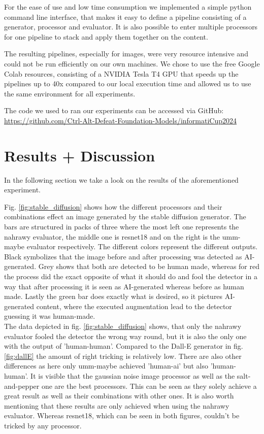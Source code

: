 \documentclass{article} %
\begin{document}
For the ease of use and low time consumption we implemented a simple python command line interface, that makes it easy to define a pipeline consisting of a generator, processor and evaluator. It is also possible to enter multiple processors for one pipeline to stack and apply them together on the content.

The resulting pipelines, especially for images, were very resource intensive and could not be run efficiently on our own machines. We chose to use the free Google Colab resources, consisting of a NVIDIA Tesla T4 GPU that speeds up the pipelines up to 40x compared to our local execution time and allowed us to use the same environment for all experiments.

The code we used to ran our experiments can be accessed via GitHub: \url{https://github.com/Ctrl-Alt-Defeat-Foundation-Models/informatiCup2024}

\section{Results + Discussion}
In the following section we take a look on the results of the aforementioned experiment.


Fig. \ref{fig:stable_diffusion} shows how the different processors and their combinations effect an image generated by the stable diffusion generator. The bars are structured in packs of three where the most left one represents the nahrawy evaluator, the middle one is resnet18 and on the right is the umm-maybe evaluator respectively. The different colors represent the different outputs. Black symbolizes that the image before and after processing was detected as AI-generated. Grey shows that both are detected to be human made, whereas for red the process did the exact opposite of what it should do and fool the detector in a way that after processing it is seen as AI-generated whereas before as human made. Lastly the green bar does exactly what is desired, so it pictures AI-generated content, where the executed augmentation lead to the detector guessing it was human-made. \\
The data depicted in fig. \ref{fig:stable_diffusion} shows, that only the nahrawy evaluator fooled the detector the wrong way round, but it is also the only one with the output of 'human-human'. Compared to the Dall-E generator in fig. \ref{fig:dallE} the amount of right tricking is relatively low. There are also other differences as here only umm-maybe achieved 'human-ai' but also 'human-human'.
It is visible that the gaussian noise image processor as well as the salt-and-pepper one are the best processors. This can be seen as they solely achieve a great result as well as their combinations with other ones. It is also worth mentioning that these results are only achieved when using the nahrawy evaluator. Whereas resnet18, which can be seen in both figures, couldn't be tricked by any processor.
\end{document}

